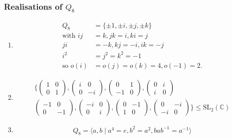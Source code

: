 \subsubsection{Realisations of \texorpdfstring{$Q_8$}{Q₈}}

\begin{enumerate}
  \item \begin{align*}
    Q_8 &= \{ \pm 1, \pm i, \pm j, \pm k \} \\
    \text{with } ij &= k, jk = i, ki = j \\
    ji &= -k, kj = -i, ik = -j \\
    i^2 &= j^2 = k^2 = -1 \\
    \text{so } o(i) &= o(j) = o(k) = 4, o(-1) = 2.
  \end{align*} 
  \item \begin{align*}
    \Biggl\{ \begin{pmatrix}
      1&0\\0&1
    \end{pmatrix},
    \begin{pmatrix}
      i & 0\\0&-i
    \end{pmatrix},
    \begin{pmatrix}
      0&1\\-1&0
    \end{pmatrix},
    \begin{pmatrix}
      0&i\\i&0
    \end{pmatrix}
    \\
    \begin{pmatrix}
      -1&0\\0&-1
    \end{pmatrix},
    \begin{pmatrix}
      -i & 0\\0&i
    \end{pmatrix},
    \begin{pmatrix}
      0&-1\\1&0
    \end{pmatrix},
    \begin{pmatrix}
      0&-i\\-i&0
    \end{pmatrix} \Biggl\} \leq \mathrm{SL}_2(\mathbb{C})
  \end{align*}
  \item \begin{align*}
    Q_8 = \langle a, b \mid a^4 = e, b^2 = a^2, b a b^{-1} = a^{-1} \rangle
  \end{align*} 
\end{enumerate} 

